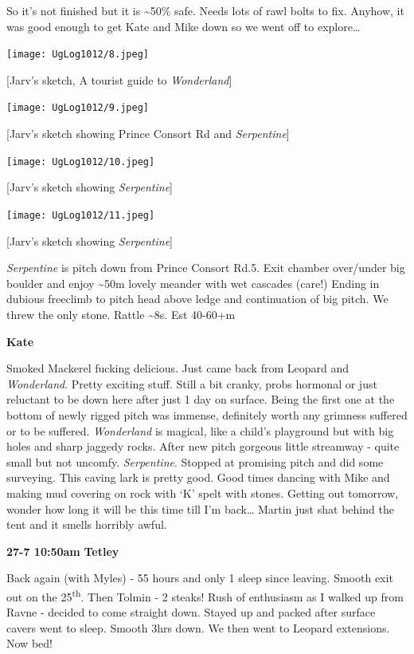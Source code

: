 So it's not finished but it is \textasciitilde{}50\% safe. Needs lots of
rawl bolts to fix. Anyhow, it was good enough to get Kate and Mike down
so we went off to explore\ldots{}

\texttt{[image: UgLog1012/8.jpeg]}

{[}Jarv's sketch, A tourist guide to \emph{Wonderland}{]}

\texttt{[image: UgLog1012/9.jpeg]}

{[}Jarv's sketch showing Prince Consort Rd and \emph{Serpentine}{]}

\texttt{[image: UgLog1012/10.jpeg]}

{[}Jarv's sketch showing \emph{Serpentine}{]}

\texttt{[image: UgLog1012/11.jpeg]}

{[}Jarv's sketch showing \emph{Serpentine}{]}

\emph{Serpentine} is pitch down from Prince Consort Rd.5. Exit chamber
over/under big boulder and enjoy \textasciitilde{}50m lovely meander
with wet cascades (care!) Ending in dubious freeclimb to pitch head
above ledge and continuation of big pitch. We threw the only stone.
Rattle \textasciitilde{}8s. Est 40-60+m

\textbf{Kate}

Smoked Mackerel fucking delicious. Just came back from Leopard and
\emph{Wonderland}. Pretty exciting stuff. Still a bit cranky, probs
hormonal or just reluctant to be down here after just 1 day on surface.
Being the first one at the bottom of newly rigged pitch was immense,
definitely worth any grimness suffered or to be suffered.
\emph{Wonderland} is magical, like a child's playground but with big
holes and sharp jaggedy rocks. After new pitch gorgeous little streamway
- quite small but not uncomfy. \emph{Serpentine}. Stopped at promising
pitch and did some surveying. This caving lark is pretty good. Good
times dancing with Mike and making mud covering on rock with `K' spelt
with stones. Getting out tomorrow, wonder how long it will be this time
till I'm back\ldots{} Martin just shat behind the tent and it smells
horribly awful.

\textbf{27-7 10:50am} \textbf{Tetley}

Back again (with Myles) - 55 hours and only 1 sleep since leaving.
Smooth exit out on the 25\textsuperscript{th}. Then Tolmin - 2 steaks!
Rush of enthusiasm as I walked up from Ravne - decided to come straight
down. Stayed up and packed after surface cavers went to sleep. Smooth
3hrs down. We then went to Leopard extensions. Now bed!

